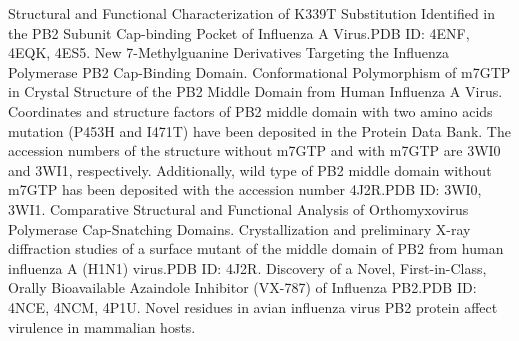 \citep{1554} Structural and Functional Characterization of K339T Substitution Identified in the PB2 Subunit Cap-binding Pocket of Influenza A Virus.PDB ID: 4ENF, 4EQK, 4ES5.%
\citep{1557} New 7-Methylguanine Derivatives Targeting the Influenza Polymerase PB2 Cap-Binding Domain.%
\citep{1546} Conformational Polymorphism of m7GTP in Crystal Structure of the PB2 Middle Domain from Human Influenza A Virus. Coordinates and structure factors of PB2 middle domain with two amino acids mutation (P453H and I471T) have been deposited in the Protein Data Bank. The accession numbers of the structure without m7GTP and with m7GTP are 3WI0 and 3WI1, respectively. Additionally, wild type of PB2 middle domain without m7GTP has been deposited with the accession number 4J2R.PDB ID: 3WI0, 3WI1.%
\citep{1560} Comparative Structural and Functional Analysis of Orthomyxovirus Polymerase Cap-Snatching Domains.%
\citep{1555} Crystallization and preliminary X-ray diffraction studies of a surface mutant of the middle domain of PB2 from human influenza A (H1N1) virus.PDB ID: 4J2R.%
\citep{1558} Discovery of a Novel, First-in-Class, Orally Bioavailable Azaindole Inhibitor (VX-787) of Influenza PB2.PDB ID: 4NCE, 4NCM, 4P1U.%
\citep{1556} Novel residues in avian influenza virus PB2 protein affect virulence in mammalian hosts.%

